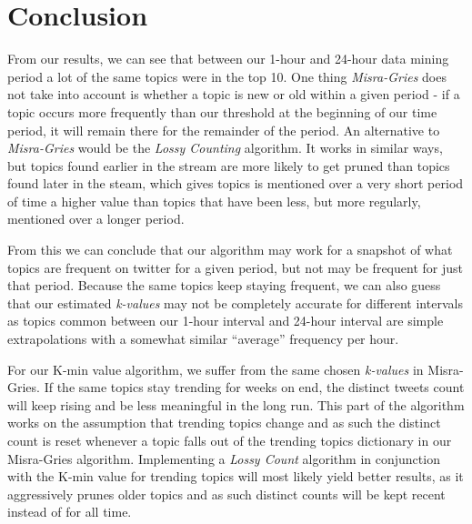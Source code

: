\section{Conclusion}
\label{conclusions}

From our results, we can see that between our 1-hour and 24-hour data mining period a lot of the same topics were in the top 10. One thing \textit{Misra-Gries} does not take into account is whether a topic is new or old within a given period - if a topic occurs more frequently than our threshold at the beginning of our time period, it will remain there for the remainder of the period. An alternative to \textit{Misra-Gries} would be the \textit{Lossy Counting} algorithm. It works in similar ways, but topics found earlier in the stream are more likely to get pruned than topics found later in the steam, which gives topics is mentioned over a very short period of time a higher value than topics that have been less, but more regularly, mentioned over a longer period.

From this we can conclude that our algorithm may work for a snapshot of what topics are frequent on twitter for a given period, but not may be frequent for just that period. Because the same topics keep staying frequent, we can also guess that our estimated \textit{k-values} may not be completely accurate for different intervals as topics common between our 1-hour interval and 24-hour interval are simple extrapolations with a somewhat similar ``average'' frequency per hour.

For our K-min value algorithm, we suffer from the same chosen \textit{k-values} in Misra-Gries. If the same topics stay trending for weeks on end, the distinct tweets count will keep rising and be less meaningful in the long run. This part of the algorithm works on the assumption that trending topics change and as such the distinct count is reset whenever a topic falls out of the trending topics dictionary in our Misra-Gries algorithm. Implementing a \textit{Lossy Count} algorithm in conjunction with the K-min value for trending topics will most likely yield better results, as it aggressively prunes older topics and as such distinct counts will be kept recent instead of for all time.